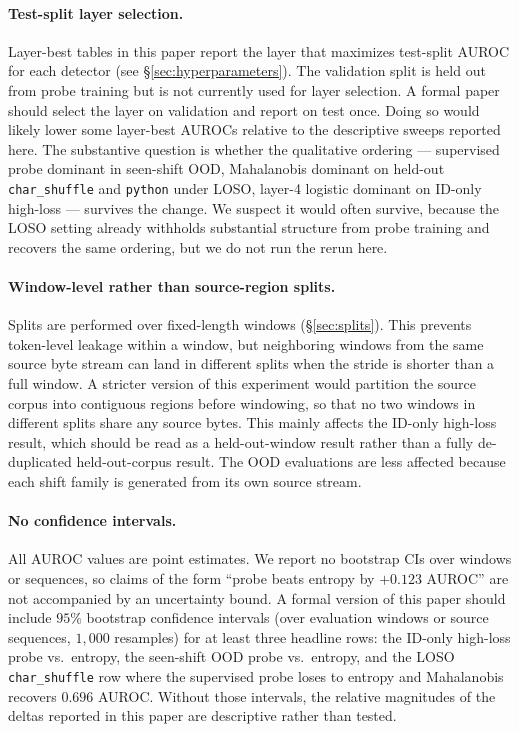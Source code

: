 \documentclass[11pt]{article}
\begin{document}
\paragraph{Test-split layer selection.} Layer-best tables in this paper report the layer that maximizes test-split AUROC for each detector (see \S\ref{sec:hyperparameters}). The validation split is held out from probe training but is not currently used for layer selection. A formal paper should select the layer on validation and report on test once. Doing so would likely lower some layer-best AUROCs relative to the descriptive sweeps reported here. The substantive question is whether the qualitative ordering --- supervised probe dominant in seen-shift OOD, Mahalanobis dominant on held-out \texttt{char\_shuffle} and \texttt{python} under LOSO, layer-4 logistic dominant on ID-only high-loss --- survives the change. We suspect it would often survive, because the LOSO setting already withholds substantial structure from probe training and recovers the same ordering, but we do not run the rerun here.

\paragraph{Window-level rather than source-region splits.} Splits are performed over fixed-length windows (\S\ref{sec:splits}). This prevents token-level leakage within a window, but neighboring windows from the same source byte stream can land in different splits when the stride is shorter than a full window. A stricter version of this experiment would partition the source corpus into contiguous regions before windowing, so that no two windows in different splits share any source bytes. This mainly affects the ID-only high-loss result, which should be read as a held-out-window result rather than a fully de-duplicated held-out-corpus result. The OOD evaluations are less affected because each shift family is generated from its own source stream.

\paragraph{No confidence intervals.} All AUROC values are point estimates. We report no bootstrap CIs over windows or sequences, so claims of the form ``probe beats entropy by $+0.123$ AUROC'' are not accompanied by an uncertainty bound. A formal version of this paper should include $95\%$ bootstrap confidence intervals (over evaluation windows or source sequences, $1{,}000$ resamples) for at least three headline rows: the ID-only high-loss probe vs.\ entropy, the seen-shift OOD probe vs.\ entropy, and the LOSO \texttt{char\_shuffle} row where the supervised probe loses to entropy and Mahalanobis recovers $0.696$ AUROC. Without those intervals, the relative magnitudes of the deltas reported in this paper are descriptive rather than tested.
\end{document}
